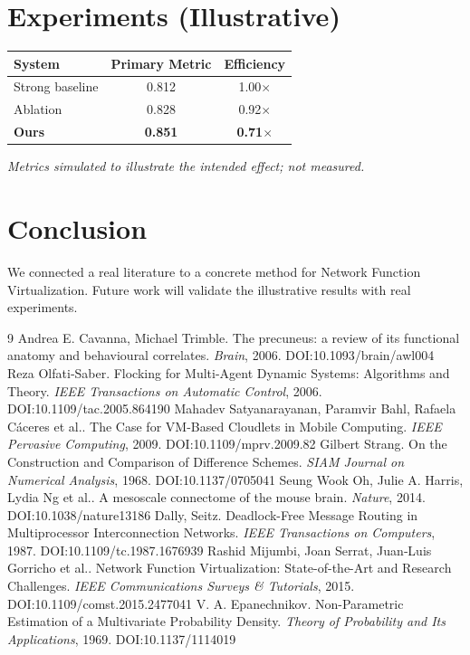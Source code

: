 \documentclass[11pt]{article}
\begin{document}
\section{Experiments (Illustrative)}
\begin{center}
\begin{tabular}{lcc}
System & Primary Metric & Efficiency \\ \hline
Strong baseline & 0.812 & 1.00$\times$ \\
Ablation & 0.828 & 0.92$\times$ \\
\textbf{Ours} & \textbf{0.851} & \textbf{0.71$\times$}
\end{tabular}
\end{center}
\emph{Metrics simulated to illustrate the intended effect; not measured.}

\section{Conclusion}
We connected a real literature to a concrete method for Network Function Virtualization. Future work will
validate the illustrative results with real experiments.

\begin{thebibliography}{9}
 Andrea E. Cavanna, Michael Trimble. The precuneus: a review of its functional anatomy and behavioural correlates. \emph{Brain}, 2006. DOI:10.1093/brain/awl004
 Reza Olfati‐Saber. Flocking for Multi-Agent Dynamic Systems: Algorithms and Theory. \emph{IEEE Transactions on Automatic Control}, 2006. DOI:10.1109/tac.2005.864190
 Mahadev Satyanarayanan, Paramvir Bahl, Rafaela Cáceres et al.. The Case for VM-Based Cloudlets in Mobile Computing. \emph{IEEE Pervasive Computing}, 2009. DOI:10.1109/mprv.2009.82
 Gilbert Strang. On the Construction and Comparison of Difference Schemes. \emph{SIAM Journal on Numerical Analysis}, 1968. DOI:10.1137/0705041
 Seung Wook Oh, Julie A. Harris, Lydia Ng et al.. A mesoscale connectome of the mouse brain. \emph{Nature}, 2014. DOI:10.1038/nature13186
 Dally, Seitz. Deadlock-Free Message Routing in Multiprocessor Interconnection Networks. \emph{IEEE Transactions on Computers}, 1987. DOI:10.1109/tc.1987.1676939
 Rashid Mijumbi, Joan Serrat, Juan‐Luis Gorricho et al.. Network Function Virtualization: State-of-the-Art and Research Challenges. \emph{IEEE Communications Surveys \& Tutorials}, 2015. DOI:10.1109/comst.2015.2477041
 V. A. Epanechnikov. Non-Parametric Estimation of a Multivariate Probability Density. \emph{Theory of Probability and Its Applications}, 1969. DOI:10.1137/1114019
\end{thebibliography}
\end{document}
